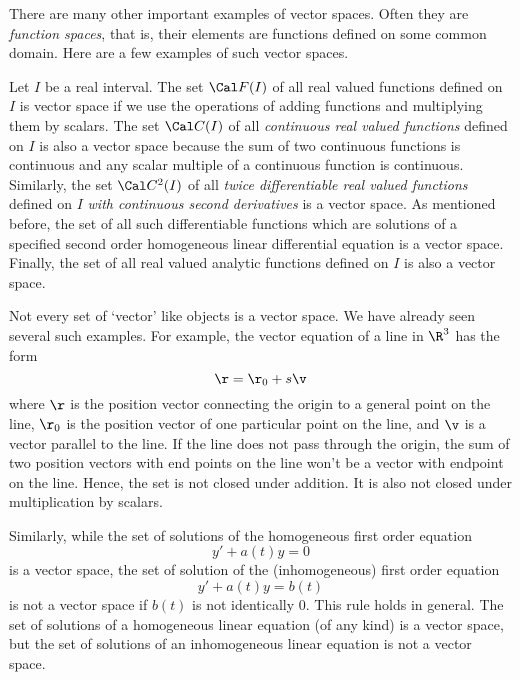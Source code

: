 There are many other important examples of vector spaces.   Often
they
are {\it function spaces\/}, that is, their elements are functions
defined on some common domain.  Here are a few examples of
such vector spaces.
%

Let  $I$ be a real interval.   The set $\Cal F(I)$ of all
real valued functions
defined on $I$ is vector space if we use the operations of adding
functions and multiplying them by scalars.  The set $\Cal C(I)$
of all {\it continuous real valued functions\/} defined on $I$ is also a vector
space because the sum of two continuous functions is continuous
and any scalar multiple of a continuous function is continuous.
Similarly, the set
$\Cal C^2(I)$ of all {\it twice differentiable real valued functions\/}
defined on $I$ {\it with continuous second derivatives\/} is a
vector space.   As mentioned before,
 the set of all such differentiable functions which are solutions of
a specified second order homogeneous linear differential equation
is a vector space.  Finally, the set of all real valued analytic functions
defined on $I$ is also a vector space.

	Not every set of `vector' like objects is a vector space.
We have already seen several such examples.   For example, the
vector equation of a line in $\R^3$ has the form
$$
\r = \r_0 + s\v
$$
where $\r$ is the position vector connecting the origin to a general
point on the line, $\r_0$ is the position vector of one particular
point on the line, and $\v$ is a vector parallel to the line.
If the line does not pass through the origin, the sum of two
position vectors with end points on the line won't be a vector
with endpoint on the line.   Hence, the set is not closed under
addition.  It is also not closed under multiplication by scalars.
\medskip
\centerline{}
\medskip
Similarly, while the set of solutions of the homogeneous
first order equation
$$
y' + a(t) y = 0
$$
is a vector space, the set of solution of the (inhomogeneous)
first order equation
$$
y' + a(t) y = b(t)
$$
is not a vector space if $b(t)$ is not identically 0.   
 This rule holds in general.  The
set of solutions of a homogeneous linear equation (of any kind)
is a vector space, but the set of solutions of an inhomogeneous
linear equation is not a vector space.



